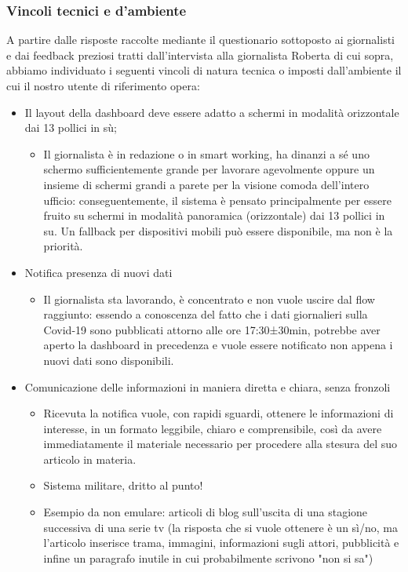 \subsubsection{Vincoli tecnici e d'ambiente}
A partire dalle risposte raccolte mediante il questionario sottoposto ai giornalisti e dai feedback preziosi tratti dall'intervista alla giornalista Roberta di cui sopra, abbiamo individuato i seguenti vincoli di natura tecnica o imposti dall'ambiente il cui il nostro utente di riferimento opera:
\begin{itemize}
    \item Il layout della dashboard deve essere adatto a schermi in modalità orizzontale dai 13 pollici in sù;
    \begin{itemize}
        \item Il giornalista è in redazione o in smart working, ha dinanzi a sé uno schermo sufficientemente grande per lavorare agevolmente oppure un insieme di schermi grandi a parete  per la visione comoda dell'intero ufficio: conseguentemente, il sistema è pensato principalmente per essere fruito su schermi in modalità panoramica (orizzontale) dai 13 pollici in su. Un fallback per dispositivi mobili può essere disponibile, ma non è la priorità.
    \end{itemize}
    \item Notifica presenza di nuovi dati
    \begin{itemize}
        \item Il giornalista sta lavorando, è concentrato e non vuole uscire dal flow raggiunto: essendo a conoscenza del fatto che i dati giornalieri sulla Covid-19 sono pubblicati attorno alle ore 17:30±30min, potrebbe aver aperto la dashboard in precedenza e vuole essere notificato non appena i nuovi dati sono disponibili.
    \end{itemize}
	\item Comunicazione delle informazioni in maniera diretta e chiara, senza fronzoli
	\begin{itemize}
        \item Ricevuta la notifica vuole, con rapidi sguardi, ottenere le informazioni di interesse, in un formato leggibile, chiaro e comprensibile, così da avere immediatamente il materiale necessario per procedere alla stesura del suo articolo in materia.
        \item Sistema militare, dritto al punto!
        \item Esempio da non emulare: articoli di blog sull'uscita di una stagione successiva di una serie tv (la risposta che si vuole ottenere è un sì/no, ma l'articolo inserisce trama, immagini, informazioni sugli attori, pubblicità e infine un paragrafo inutile in cui probabilmente scrivono "non si sa")

\end{itemize}
\end{itemize}
